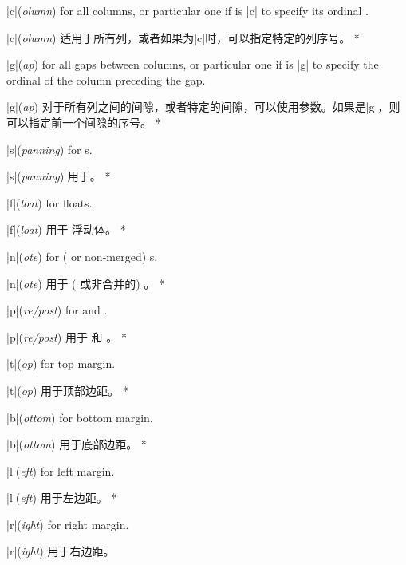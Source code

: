\begin{description}
\begin{description}
\begin{paracol}{2}
\item[|c|\rm(\textit{olumn})] for all columns, or particular one if
 is |c| to specify its ordinal .
\switchcolumn\item[|c|\rm(\textit{olumn})]
适用于所有列，或者如果为|c|时，可以指定特定的列序号。
\switchcolumn[0]*
\item[|g|\rm(\textit{ap})] for all gaps between columns, or particular one
if  is |g| to specify the ordinal  of the
column preceding the gap.
\switchcolumn
\item[|g|\rm(\textit{ap})]
对于所有列之间的间隙，或者特定的间隙，可以使用参数。如果是|g|，则可以指定前一个间隙的序号。
\switchcolumn[0]*
\item[|s|\rm(\textit{panning})] for \mctext{}s.
\switchcolumn\item[|s|\rm(\textit{panning})]
用于\mctext{}。
\switchcolumn[0]*
\item[|f|\rm(\textit{loat})] for \pwise{} floats.
\switchcolumn\item[|f|\rm(\textit{loat})]
用于 \pwise{} 浮动体。
\switchcolumn[0]*
\item[|n|\rm(\textit{ote})] for (\mgfnote{} or non-merged) \Scfnote{}s.
\switchcolumn\item[|n|\rm(\textit{ote})]
用于 (\mgfnote{} 或非合并的) \Scfnote{}。
\switchcolumn[0]*
\item[|p|\rm(\textit{re/post})] for \Preenv{} and \postenv.
\switchcolumn\item[|p|\rm(\textit{re/post})]
用于 \Preenv{} 和 \postenv。
\switchcolumn[0]*
\item[|t|\rm(\textit{op})] for top margin.
\switchcolumn\item[|t|\rm(\textit{op})]
用于顶部边距。
\switchcolumn[0]*
\item[|b|\rm(\textit{ottom})] for bottom margin.
\switchcolumn\item[|b|\rm(\textit{ottom})]
用于底部边距。
\switchcolumn[0]*
\item[|l|\rm(\textit{eft})] for left margin.
\switchcolumn\item[|l|\rm(\textit{eft})]
用于左边距。
\switchcolumn[0]*
\item[|r|\rm(\textit{ight})] for right margin.
\switchcolumn\item[|r|\rm(\textit{ight})]
用于右边距。
\end{paracol}


\end{description}
\end{description}
